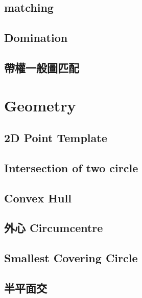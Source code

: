 \subsection{matching}

\subsection{Domination}

%
\subsection{帶權一般圖匹配}



\section{Geometry}

\subsection{2D Point Template}

\subsection{Intersection of two circle}

\subsection{Convex Hull}

\subsection{外心 Circumcentre}

\subsection{Smallest Covering Circle}

\subsection{半平面交}

